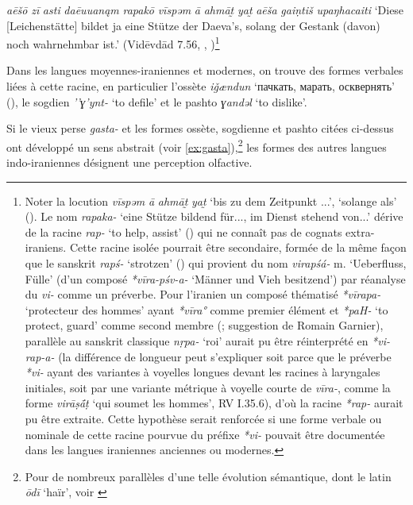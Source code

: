 \documentclass[11pt]{article}
\newcommand{\ipa}[1]{{\phon\textit{#1}}}
\newcommand{\forme}[1]{{\phon#1}}
\begin{document}
\begin{exe}
\ex \label{ex:gantish}
\glt 
\ipa{aēšō} \ipa{zī} \ipa{asti} \ipa{daēuuanąm} \ipa{rapakō} \ipa{vīspəm} \ipa{ā} \ipa{ahmāt̰} \ipa{yat̰} \ipa{aēša} \ipa{gaiṇtiš} \ipa{upaŋhacaiti}
\glt `Diese [Leichenstätte] bildet ja eine Stütze der Daeva's, solang der Gestank (davon) noch wahrnehmbar ist.' (Vidēvdād 7.56, \citealt[1741]{bartholomae1904altiranisches}, \citealt[363]{wolff1910avesta})\footnote{Noter la locution \ipa{vīspəm} \ipa{ā} \ipa{ahmāt̰} \ipa{yat̰} `bis zu dem Zeitpunkt ...', `solange als' (\citealt[1466]{bartholomae1904altiranisches}). Le nom \ipa{rapaka-} `eine Stütze bildend für..., im Dienst stehend von...' dérive de la racine \ipa{rap-} ‘to help, assist’ (\citealt[314]{cheung07dictionary}) qui ne connaît pas de cognats extra-iraniens. Cette racine isolée pourrait être secondaire, formée de la même façon que le sanskrit \ipa{rapś-} `strotzen' (\citealt[II:559]{mayrhofer92ewa}) %
qui provient du nom \ipa{virapśá-} m. `Ueberfluss, Fülle' (d'un composé \ipa{*vīra-pśv-a-} `Männer und Vieh besitzend') par réanalyse du \ipa{vi-} comme un préverbe. Pour l'iranien un composé thématisé \ipa{*vīrapa-} `protecteur des hommes' ayant \ipa{*vīra°} comme premier élément et \ipa{*paH-} `to protect, guard' comme second membre (\citealt[288]{cheung07dictionary}; suggestion de Romain Garnier), parallèle au sanskrit classique \ipa{nṛpa-} `roi' aurait pu être réinterprété en \ipa{*vi-rap-a-} (la différence de longueur peut s'expliquer soit parce que le préverbe \ipa{*vi-} ayant des variantes à voyelles longues devant les racines à laryngales initiales, soit par une variante métrique à voyelle courte de \ipa{vīra-}, comme la forme \ipa{virāṣā́ṭ} `qui soumet les hommes', RV I.35.6), d'où la racine \ipa{*rap-} aurait pu être extraite. Cette hypothèse serait renforcée si une forme verbale ou nominale de cette racine pourvue du préfixe \ipa{*vi-} pouvait être documentée dans les langues iraniennes anciennes ou modernes.
}
\end{exe}

Dans les langues moyennes-iraniennes et modernes, on trouve des formes verbales liées à cette racine, en particulier l'ossète \ipa{iǧændun} `\forme{пачкать, марать, осквернять}' (\citealt[542]{abaev58vol1}), le sogdien \ipa{’’ɣ’ynt-} ‘to defile’ et le pashto \ipa{ɣandəl} ‘to dislike'.


Si le vieux perse \ipa{gasta-} et les formes ossète, sogdienne et pashto citées ci-dessus ont développé un sens abstrait (voir \ref{ex:gasta}),\footnote{Pour de nombreux parallèles d'une telle évolution sémantique, dont le latin \ipa{ōdī} `haïr', voir \citet[55-59]{garnier10vocalisme}
} les formes des autres langues indo-iraniennes désignent une perception olfactive. 
\end{document}
